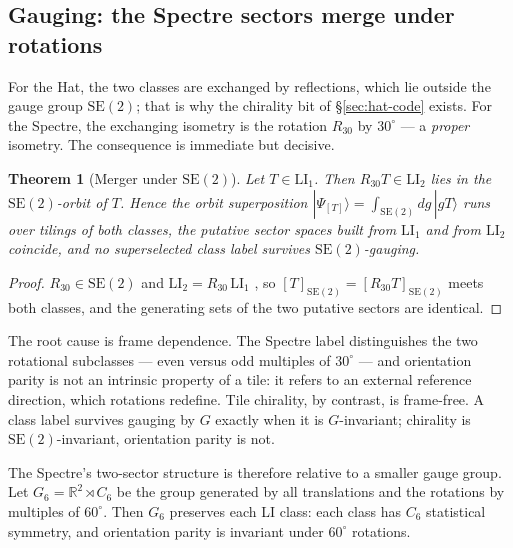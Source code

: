 \documentclass[a4paper,unpublished]{quantumarticle}
\newtheorem{theorem}{Theorem}
\theoremstyle{remark}
\newcommand{\RR}{\mathbb{R}}
\newcommand{\SEtwo}{\mathrm{SE}(2)}
\newcommand{\LI}{\mathrm{LI}}
\begin{document}
\subsection{Gauging: the Spectre sectors merge under rotations}
\label{sec:spec-qubit}

For the Hat, the two classes are exchanged by reflections, which lie
outside the gauge group $\SEtwo$; that is why the chirality bit of
\S\ref{sec:hat-code} exists. For the Spectre, the exchanging isometry
is the rotation $R_{30}$ by $30^{\circ}$ \cite{BGMS2025} --- a
\emph{proper} isometry. The consequence is immediate but decisive.

\begin{theorem}[Merger under $\SEtwo$]
\label{thm:merger}
Let $T \in \LI_{1}$. Then $R_{30} T \in \LI_{2}$ lies in the
$\SEtwo$-orbit of $T$. Hence the orbit superposition
$|\Psi_{[T]}\rangle = \int_{\SEtwo} dg\, |gT\rangle$ runs over
tilings of both classes, the putative sector spaces built from
$\LI_{1}$ and from $\LI_{2}$ coincide, and no superselected class
label survives $\SEtwo$-gauging.
\end{theorem}

\begin{proof}
$R_{30} \in \SEtwo$ and $\LI_{2} = R_{30}\, \LI_{1}$
\cite{BGMS2025}, so $[T]_{\SEtwo} = [R_{30}T]_{\SEtwo}$ meets both
classes, and the generating sets of the two putative sectors are
identical.
\end{proof}

The root cause is frame dependence. The Spectre label distinguishes
the two rotational subclasses --- even versus odd multiples of
$30^{\circ}$ --- and orientation parity is not an intrinsic property
of a tile: it refers to an external reference direction, which
rotations redefine. Tile chirality, by contrast, is frame-free. A
class label survives gauging by $G$ exactly when it is $G$-invariant;
chirality is $\SEtwo$-invariant, orientation parity is not.

The Spectre's two-sector structure is therefore relative to a smaller
gauge group. Let $G_{6} = \RR^{2} \rtimes C_{6}$ be the group
generated by all translations and the rotations by multiples of
$60^{\circ}$. Then $G_{6}$ preserves each LI class: each class has
$C_{6}$ statistical symmetry, and orientation parity is invariant
under $60^{\circ}$ rotations.
\end{document}
